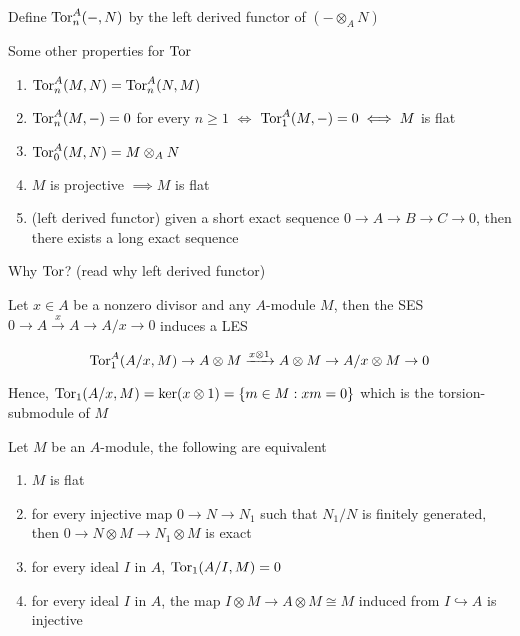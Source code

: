 \begin{definition}[$\Tor$]
	Define $\operatorname{Tor}_{n}^A(-, N)$ by the left derived functor of $(- \otimes_A N)$
\end{definition}

\begin{proposition}
	Some other properties for $\Tor$
	\begin{enumerate}
		\item $\operatorname{Tor}_n^A(M, N) = \operatorname{Tor}_n^A(N, M)$
		\item $\operatorname{Tor}_n^A(M, -) = 0$ for every $n \geq 1$ $\iff$  $\operatorname{Tor}_1^A(M, -) = 0 \iff M$ is flat
		\item $\operatorname{Tor}_0^A(M, N) = M \otimes_A N$
		\item $M$ is projective $\implies M$ is flat
		\item (left derived functor) given a short exact sequence $0 \to A \to B \to C \to 0$, then there exists a long exact sequence
		\begin{center}
		\end{center}
	\end{enumerate}
\end{proposition}

Why $\Tor$? (read why left derived functor)

Let $x \in A$ be a nonzero divisor and any $A$-module $M$, then the SES $0 \to A \xrightarrow{x} A \to A/x \to 0$ induces a LES

$$
	\operatorname{Tor}_1^A(A/x, M) \to A \otimes M \xrightarrow{x \otimes 1} A \otimes M \to A / x \otimes M \to 0
$$

Hence, $\operatorname{Tor}_1(A/x, M) = \ker (x \otimes 1) = \{m \in M: xm = 0\}$ which is the torsion-submodule of $M$

\begin{theorem}
	Let $M$ be an $A$-module, the following are equivalent
	\begin{enumerate}
		\item $M$ is flat
		\item for every injective map $0 \to N \to N_1$ such that $N_1 / N$ is finitely generated, then $0 \to N \otimes M \to N_1 \otimes M$ is exact
		\item for every ideal $I$ in $A$, $\operatorname{Tor}_1(A / I, M) = 0$
		\item for every ideal $I$ in $A$, the map $I \otimes M \to A \otimes M \cong M$  induced from $I \hookrightarrow A$ is injective 
	\end{enumerate}
\end{theorem}

